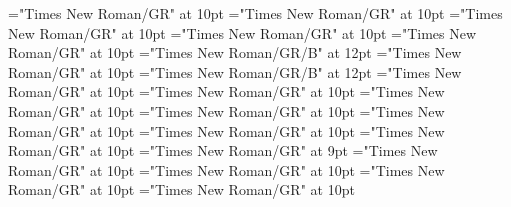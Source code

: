 \documentclass[gps1,twoside]{article}
\begin{document}
\font\variantentrytypevariantentrytypevariantentrytypesvisiblevariantentryrefvisiblevariantentryrefsminorentrycomplexbefore="Times New Roman/GR" at 10pt
\font\variantentrytypesvisiblevariantentryrefvisiblevariantentryrefsminorentrycomplexafter="Times New Roman/GR" at 10pt
\font\spanspanabbreviationvariantentrytypevariantentrytypesvisiblevariantentryrefvisiblevariantentryrefsminorentrycomplexbefore="Times New Roman/GR" at 10pt
\font\spanabbreviationvariantentrytypevariantentrytypesvisiblevariantentryrefvisiblevariantentryrefsminorentrycomplexlastchildafter="Times New Roman/GR" at 10pt
\font{}="Times New Roman/GR" at 10pt
\font\spanbzhheadwordreferencedentryreferencedentriesvisiblevariantentryrefvisiblevariantentryrefsminorentrycomplex="Times New Roman/GR/B" at 12pt
\font\spanspanheadwordreferencedentryreferencedentriesvisiblevariantentryrefvisiblevariantentryrefsminorentrycomplexbefore="Times New Roman/GR" at 10pt
\font\spanheadwordreferencedentryreferencedentriesvisiblevariantentryrefvisiblevariantentryrefsminorentrycomplex="Times New Roman/GR/B" at 12pt
\font\spanspandefinitionorglossreferencedentryreferencedentriesvisiblevariantentryrefvisiblevariantentryrefsminorentrycomplexbefore="Times New Roman/GR" at 10pt
\font\spandefinitionorglossreferencedentryreferencedentriesvisiblevariantentryrefvisiblevariantentryrefsminorentrycomplexfirstchildbefore="Times New Roman/GR" at 10pt
\font\spanspansummaryvisiblevariantentryrefvisiblevariantentryrefsminorentrycomplexbefore="Times New Roman/GR" at 10pt
\font\spansummaryvisiblevariantentryrefvisiblevariantentryrefsminorentrycomplexfirstchildbefore="Times New Roman/GR" at 10pt
\font\spanspancomplexformentryrefsminorentrycomplexbefore="Times New Roman/GR" at 10pt
\font\complexformentryrefsminorentrycomplexbefore="Times New Roman/GR" at 10pt
\font\complexformentryrefsminorentrycomplexafter="Times New Roman/GR" at 10pt
\font\complexformtypecomplexformtypecomplexformtypescomplexformentryrefcomplexformentryrefsminorentrycomplexbefore="Times New Roman/GR" at 9pt
\font\complexformtypescomplexformentryrefcomplexformentryrefsminorentrycomplexafter="Times New Roman/GR" at 10pt
\font\spanspanabbreviationcomplexformtypecomplexformtypescomplexformentryrefcomplexformentryrefsminorentrycomplexbefore="Times New Roman/GR" at 10pt
\font\spanabbreviationcomplexformtypecomplexformtypescomplexformentryrefcomplexformentryrefsminorentrycomplexlastchildafter="Times New Roman/GR" at 10pt
\font{}="Times New Roman/GR" at 10pt
\end{document}
